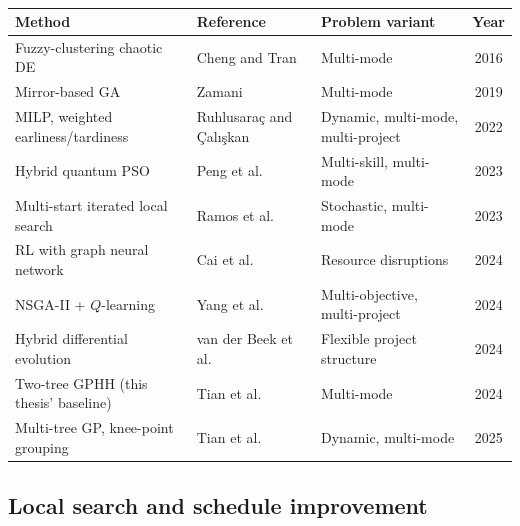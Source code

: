 \begin{table}[htbp]
  \centering
  \caption[Representative metaheuristic approaches for (M)RCPSP]{}
  \label{tab:recent-approaches}
  \begin{tabularx}{\textwidth}{@{}>{\raggedright\arraybackslash}X >{\raggedright\arraybackslash}p{3.1cm} >{\raggedright\arraybackslash}X c@{}}
    \toprule
    \textbf{Method} & \textbf{Reference} & \textbf{Problem variant} & \textbf{Year} \\
    \midrule
    Fuzzy-clustering chaotic DE & Cheng and Tran~\cite{cheng2016fcde} & Multi-mode & 2016 \\
    Mirror-based GA & Zamani~\cite{zamani2019mirror} & Multi-mode & 2019 \\
    MILP, weighted earliness/tardiness & Ruhlusara\c{c} and \c{C}al{\i}\c{s}kan~\cite{ruhlusarac2022dynamic} & Dynamic, multi-mode, multi-project & 2022 \\
    Hybrid quantum PSO & Peng et al.~\cite{peng2023quantumpso} & Multi-skill, multi-mode & 2023 \\
    Multi-start iterated local search & Ramos et al.~\cite{ramos2023stochastic} & Stochastic, multi-mode & 2023 \\
    RL with graph neural network & Cai et al.~\cite{cai2024rlgnn} & Resource disruptions & 2024 \\
    NSGA-II + $Q$-learning & Yang et al.~\cite{yang2024biobjective} & Multi-objective, multi-project & 2024 \\
    Hybrid differential evolution & van der Beek et al.~\cite{VanDerBeek2024} & Flexible project structure & 2024 \\
    Two-tree GPHH (this thesis' baseline) & Tian et al.~\cite{Tian2024GPHH} & Multi-mode & 2024 \\
    Multi-tree GP, knee-point grouping & Tian et al.~\cite{tian2025multitree} & Dynamic, multi-mode & 2025 \\
    \bottomrule
  \end{tabularx}
\end{table}

\subsection{Local search and schedule improvement}
\label{subsec:local-search}

